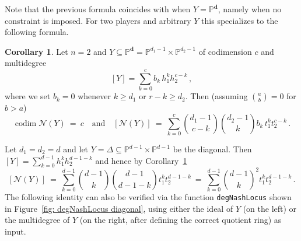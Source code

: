 \documentclass[12pt]{article}
\theoremstyle{definition}
\newtheorem{cor}[theorem]{Corollary}
\newenvironment{example}
{\pushQED{\qed}\renewcommand{\qedsymbol}{$\diamond$}\examplex}
{\popQED\endexamplex}
\newcommand{\PP}{{\mathbb P}}
\def\bd{{\boldsymbol{d}}}
\def\codim{\operatorname{codim}}
\newcommand{\kn}{{\mathcal N}}
\begin{document}
Note that the previous formula coincides with \cite[Theorem 2.8]{abo2026vector} when $Y=\PP^\bd$, namely when no constraint is imposed. For two players and arbitrary $Y$ this specializes to the following formula.

\begin{cor}\label{cor: multidegree two factors}
Let $n=2$ and $Y\subseteq\PP^\bd=\PP^{d_1-1}\times\PP^{d_2-1}$ of codimension $c$ and multidegree
\[
    [Y] = \sum_{k=0}^c b_k\,h_1^kh_2^{c-k}\,,
\]
where we set $b_k=0$ whenever $k\geq d_1$ or $r-k\geq d_2$. Then (assuming $\binom{a}{b}=0$ for $b>a$)
\[
\codim\kn(Y)\ =\ c\quad\text{and}\quad[\kn(Y)]\ =\ \sum_{k=0}^c\binom{d_1-1}{c-k}\binom{d_2-1}{k}b_k\,t_1^kt_2^{c-k}\,.
\]
\end{cor}

\begin{example}
Let $d_1=d_2=d$ and let $Y=\Delta\subseteq\PP^{d-1}\times\PP^{d-1}$ be the diagonal. Then $[Y]=\sum_{k=0}^{d-1}h_1^kh_2^{d-1-k}$ and hence by Corollary~\ref{cor: multidegree two factors}
\[
    [\kn(Y)]\ =\ \sum_{k=0}^{d-1}\binom{d-1}{k}\binom{d-1}{d-1-k}t_1^kt_2^{d-1-k}\ =\ \sum_{k=0}^{d-1}\binom{d-1}{k}^2t_1^kt_2^{d-1-k}\,.
\]
The following identity can also be verified via the function {\tt degNashLocus} shown in Figure~\ref{fig: degNashLocus diagonal}, using either the ideal of $Y$ (on the left) or the multidegree of $Y$ (on the right, after defining the correct quotient ring) as input.
\end{example}
\end{document}
